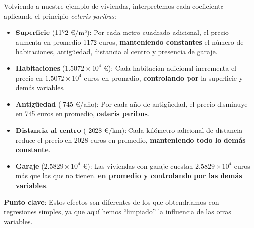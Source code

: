 \documentclass[
  letterpaper,
  DIV=11,
  numbers=noendperiod]{scrreprt}
\begin{document}
\begin{tcolorbox}[enhanced jigsaw, leftrule=.75mm, breakable, colbacktitle=quarto-callout-tip-color!10!white, bottomrule=.15mm, colframe=quarto-callout-tip-color-frame, toprule=.15mm, colback=white, coltitle=black, bottomtitle=1mm, left=2mm, title=\textcolor{quarto-callout-tip-color}{\faLightbulb}\hspace{0.5em}{Interpretación práctica de los coeficientes}, opacityback=0, arc=.35mm, opacitybacktitle=0.6, toptitle=1mm, titlerule=0mm, rightrule=.15mm]

Volviendo a nuestro ejemplo de viviendas, interpretemos cada coeficiente
aplicando el principio \emph{ceteris paribus}:

\begin{itemize}
\item
  \textbf{Superficie} (1172 €/m²): Por cada metro cuadrado adicional, el
  precio aumenta en promedio 1172 euros, \textbf{manteniendo constantes}
  el número de habitaciones, antigüedad, distancia al centro y presencia
  de garaje.
\item
  \textbf{Habitaciones} (\ensuremath{1.5072\times 10^{4}} €): Cada
  habitación adicional incrementa el precio en
  \ensuremath{1.5072\times 10^{4}} euros en promedio,
  \textbf{controlando por} la superficie y demás variables.
\item
  \textbf{Antigüedad} (-745 €/año): Por cada año de antigüedad, el
  precio disminuye en 745 euros en promedio, \textbf{ceteris paribus}.
\item
  \textbf{Distancia al centro} (-2028 €/km): Cada kilómetro adicional de
  distancia reduce el precio en 2028 euros en promedio,
  \textbf{manteniendo todo lo demás constante}.
\item
  \textbf{Garaje} (\ensuremath{2.5829\times 10^{4}} €): Las viviendas
  con garaje cuestan \ensuremath{2.5829\times 10^{4}} euros más que las
  que no tienen, \textbf{en promedio y controlando por las demás
  variables}.
\end{itemize}

\textbf{Punto clave}: Estos efectos son diferentes de los que
obtendríamos con regresiones simples, ya que aquí hemos ``limpiado'' la
influencia de las otras variables.

\end{tcolorbox}
\end{document}
